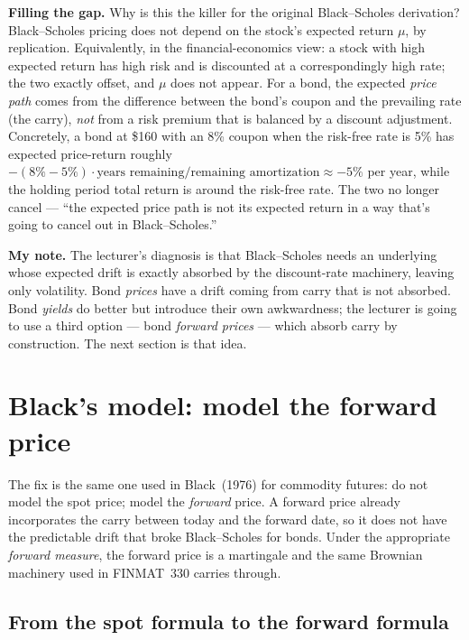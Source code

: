 \begin{tipblock}
\textbf{Filling the gap.} Why is this the killer for the original
Black--Scholes derivation? Black--Scholes pricing does not depend on
the stock's expected return $\mu$, by replication. Equivalently, in
the financial-economics view: a stock with high expected return has
high risk and is discounted at a correspondingly high rate; the two
exactly offset, and $\mu$ does not appear. For a bond, the expected
\emph{price path} comes from the difference between the bond's coupon
and the prevailing rate (the carry), \emph{not} from a risk premium
that is balanced by a discount adjustment. Concretely, a bond at
\$160 with an 8\% coupon when the risk-free rate is 5\% has expected
price-return roughly $-(8\%-5\%) \cdot \text{years remaining}/\text{remaining
amortization} \approx -5\%$ per year, while the holding period total
return is around the risk-free rate. The two no longer cancel ---
``the expected price path is not its expected return in a way that's
going to cancel out in Black--Scholes.''
\end{tipblock}

\begin{checkpoint}
\textbf{My note.} The lecturer's diagnosis is that Black--Scholes
needs an underlying whose expected drift is exactly absorbed by the
discount-rate machinery, leaving only volatility. Bond \emph{prices}
have a drift coming from carry that is not absorbed. Bond \emph{yields}
do better but introduce their own awkwardness; the lecturer is going
to use a third option --- bond \emph{forward prices} --- which absorb
carry by construction. The next section is that idea.
\end{checkpoint}

\section{Black's model: model the forward price}\label{L5-sec:black76}

The fix is the same one used in Black~(1976) for commodity futures: do
not model the spot price; model the \emph{forward} price. A forward
price already incorporates the carry between today and the forward
date, so it does not have the predictable drift that broke
Black--Scholes for bonds. Under the appropriate \emph{forward
measure}, the forward price is a martingale and the same Brownian
machinery used in FINMAT~330 carries through.

\subsection{From the spot formula to the forward formula}\label{L5-sec:black-classic}

